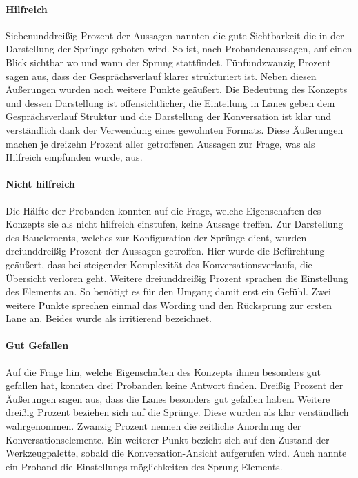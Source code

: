 \paragraph{Hilfreich} Siebenunddreißig Prozent der Aussagen nannten die gute Sichtbarkeit die in der Darstellung der Sprünge geboten wird. So ist, nach Probandenaussagen, auf einen Blick sichtbar wo und wann der Sprung stattfindet. Fünfundzwanzig Prozent sagen aus, dass der Gesprächsverlauf klarer strukturiert ist. Neben diesen Äußerungen wurden noch weitere Punkte geäußert. Die Bedeutung des Konzepts und dessen Darstellung ist offensichtlicher, die Einteilung in Lanes geben dem Gesprächsverlauf Struktur und die Darstellung der Konversation ist klar und verständlich dank der Verwendung eines gewohnten Formats. Diese Äußerungen machen je dreizehn Prozent aller getroffenen Aussagen zur Frage, was als Hilfreich empfunden wurde, aus.

\paragraph{Nicht hilfreich}Die Hälfte der Probanden konnten auf die Frage, welche Eigenschaften des Konzepts sie als nicht hilfreich einstufen, keine Aussage treffen. Zur Darstellung des Bauelements, welches zur Konfiguration der Sprünge dient, wurden dreiunddreißig Prozent der Aussagen getroffen. Hier wurde die Befürchtung geäußert, dass bei steigender Komplexität des Konversationsverlaufs, die Übersicht verloren geht. Weitere dreiunddreißig Prozent sprachen die Einstellung des Elements an. So benötigt es für den Umgang damit erst ein Gefühl. Zwei weitere Punkte sprechen einmal das Wording und den Rücksprung zur ersten Lane an. Beides wurde als irritierend bezeichnet.

\paragraph{Gut Gefallen}Auf die Frage hin, welche Eigenschaften des Konzepts ihnen besonders gut gefallen hat, konnten drei Probanden keine Antwort finden. Dreißig Prozent der Äußerungen sagen aus, dass die Lanes besonders gut gefallen haben. Weitere dreißig Prozent beziehen sich auf die Sprünge. Diese wurden als klar verständlich wahrgenommen. Zwanzig Prozent nennen die zeitliche Anordnung der Konversationselemente. Ein weiterer Punkt bezieht sich auf den Zustand der Werkzeugpalette, sobald die Konversation-Ansicht aufgerufen wird. Auch nannte ein Proband die Einstellungs-möglichkeiten des Sprung-Elements.

